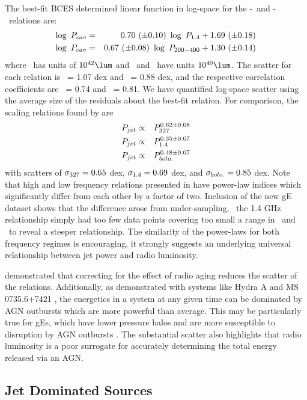 \documentclass{emulateapj}
\begin{document}
The best-fit BCES determined linear function in log-space for the
\pcav-\phigh\ and \pcav-\plow\ relations are:
\begin{eqnarray}
\log~P_{cav} &=& 0.70~(\pm 0.10)~\log~P_{\mathrm{1.4}} + 1.69~(\pm 0.18)\\
\log~P_{cav} &=& 0.67~(\pm 0.08)~\log~P_{\mathrm{200-400}} + 1.30~(\pm 0.14)
\end{eqnarray}
where \pcav\ has units of $10^{42} \lum$ and \phigh\ and \plow\ have
units $10^{40} \lum$.  The scatter for each relation is \shigh\ = 1.07
dex and \slow\ = 0.88 dex, and the respective correlation coefficients
are \rhigh\ = 0.74 and \rlow\ = 0.81. We have quantified log-space
scatter using the average size of the residuals about the best-fit
relation. For comparison, the scaling relations found by
\citet{birzan08} are
\begin{eqnarray}
P_{jet} &\propto& P_{\mathrm{327}}^{0.62 \pm 0.08}\\
P_{jet} &\propto& P_{\mathrm{1.4}}^{0.35 \pm 0.07}\\
P_{jet} &\propto& P_{bolo.}^{0.48 \pm 0.07}
\end{eqnarray}
with scatters of $\sigma_{\mathrm{327}} = 0.65$ dex, $\sigma_{\mathrm{1.4}} = 0.69$ dex, and
$\sigma_{bolo.} = 0.85$ dex. Note that high and low frequency relations
presented in \citet{birzan08} have power-law indices which
significantly differ from each other by a factor of two. Inclusion of
the new gE dataset shows that the difference arose from under-sampling,
\ie\ the 1.4 GHz relationship simply had too few data points covering
too small a range in \pcav\ and \prad\ to reveal a steeper
relationship. The similarity of the power-laws for both frequency
regimes is encouraging, it strongly suggests an underlying universal
relationship between jet power and radio luminosity.

\citet{birzan08} demonstrated that correcting for the effect of radio
aging reduces the scatter of the relations. Additionally, as
demonstrated with systems like Hydra A \citep{hydraa} and MS
0735.6+7421 \citep{ms0735}, the energetics in a system at any given
time can be dominated by AGN outbursts which are more powerful than
average. This may be particularly true for gEs, which have lower
pressure halos and are more susceptible to disruption by AGN outbursts
\citep{minggroups}. The substantial scatter also highlights that radio
luminosity is a poor surrogate for accurately determining the total
energy released via an AGN.

\subsection{Jet Dominated Sources}
\label{sec:jet}
\end{document}

